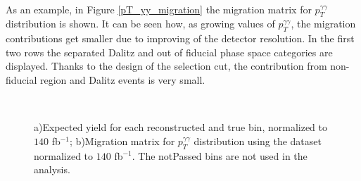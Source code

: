 \\
As an example, in Figure \ref{pT_yy_migration} the migration matrix for $p_T^{\gamma\gamma}$ distribution is shown. It can be seen how, as growing values of $p_T^{\gamma\gamma}$, the migration contributions get smaller due to improving of the detector resolution. In the first two rows the separated Dalitz and out of fiducial phase space categories are displayed. Thanks to the design of the selection cut, the contribution from non-fiducial region and Dalitz events is very small.
\begin{figure}[H]
\centering
{} \\
\caption{a)Expected yield for each reconstructed and true bin, normalized to $140$ fb$^{-1}$; b)Migration matrix for $p_T^{\gamma\gamma}$ distribution using the dataset normalized to $140$ fb$^{-1}$. The notPassed bins are not used in the analysis.}
\end{figure}

